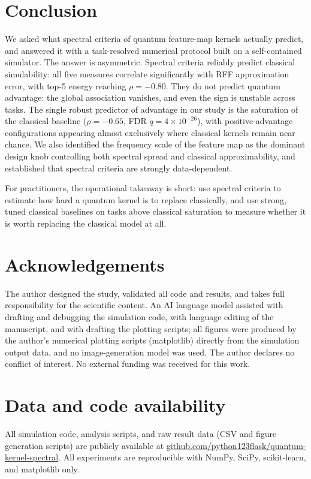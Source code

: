 \documentclass[a4paper,unpublished,onecolumn,nopdfoutputerror,12pt]{quantumarticle}
\begin{document}
\section{Conclusion}
\label{sec:conclusion}

We asked what spectral criteria of quantum feature-map kernels actually predict, and
answered it with a task-resolved numerical protocol built on a self-contained
simulator. The answer is asymmetric. Spectral criteria reliably predict classical
simulability: all five measures correlate significantly with RFF approximation error,
with top-5 energy reaching $\rho=-0.80$. They do not predict quantum advantage: the
global association vanishes, and even the sign is unstable across tasks. The single
robust predictor of advantage in our study is the saturation of the classical baseline
($\rho=-0.65$, FDR $q=4\times10^{-26}$), with positive-advantage configurations
appearing almost exclusively where classical kernels remain near chance. We also
identified the frequency scale of the feature map as the dominant design knob
controlling both spectral spread and classical approximability, and established that
spectral criteria are strongly data-dependent.

For practitioners, the operational takeaway is short: use spectral criteria to
estimate how hard a quantum kernel is to replace classically, and use strong, tuned
classical baselines on tasks above classical saturation to measure whether it is worth
replacing the classical model at all.

\section*{Acknowledgements}
The author designed the study, validated all code and results, and takes full
responsibility for the scientific content. An AI language model assisted with
drafting and debugging the simulation code, with language editing of the manuscript,
and with drafting the plotting scripts; all figures were produced by the author's
numerical plotting scripts (matplotlib) directly from the simulation output data,
and no image-generation model was used. The author declares no conflict of interest.
No external funding was received for this work.

\section*{Data and code availability}
All simulation code, analysis scripts, and raw result data (CSV and figure
generation scripts) are publicly available at
\href{https://github.com/python123flask/quantum-kernel-spectral}{github.com/python123flask/quantum-kernel-spectral}.
All experiments are reproducible with NumPy, SciPy, scikit-learn, and matplotlib only.



\end{document}
